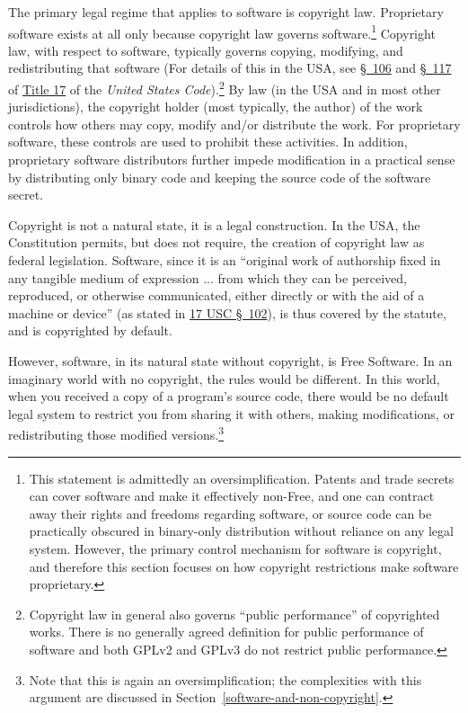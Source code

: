 \label{explaining-copyright}

The primary legal regime that applies to software is copyright law.
Proprietary software exists at all only because copyright law governs
software.\footnote{This statement is admittedly an oversimplification. Patents and
  trade secrets can cover software and make it effectively non-Free, and one
  can contract away their rights and freedoms regarding software, or source
  code can be practically obscured in binary-only distribution without
  reliance on any legal system.  However, the primary control mechanism for
  software is copyright, and therefore this section focuses on how copyright
  restrictions make software proprietary.} Copyright law, with respect to
software, typically governs copying, modifying, and redistributing that
software (For details of this in the USA, see
\href{http://www.copyright.gov/title17/92chap1.html#106}{\S~106} and
\href{http://www.copyright.gov/title17/92chap1.html#117}{\S~117} of
\href{http://www.law.cornell.edu/uscode/text/17}{Title 17} of the
\textit{United States Code}).\footnote{Copyright law in general also governs
  ``public performance'' of copyrighted works. There is no generally agreed
  definition for public performance of software and both GPLv2 and GPLv3 do
  not restrict public performance.} By law (in the USA and in most other
jurisdictions), the copyright holder (most typically, the author) of the work controls
how others may copy, modify and/or distribute the work. For proprietary
software, these controls are used to prohibit these activities. In addition,
proprietary software distributors further impede modification in a practical
sense by distributing only binary code and keeping the source code of the
software secret.

Copyright is not a natural state, it is a legal construction. In the USA, the
Constitution permits, but does not require, the creation of copyright law as
federal legislation.  Software, since it is an ``original work of authorship
fixed in any tangible medium of expression ...  from which they can be
perceived, reproduced, or otherwise communicated, either directly or with the
aid of a machine or device'' (as stated in
\href{http://www.law.cornell.edu/uscode/text/17/102}{17 USC \S~102}), is thus
covered by the statute, and is copyrighted by default.

However, software, in its natural state without copyright, is Free
Software. In an imaginary world with no copyright, the rules would be
different. In this world, when you received a copy of a program's source
code, there would be no default legal system to restrict you from sharing it
with others, making modifications, or redistributing those modified
versions.\footnote{Note that this is again an oversimplification; the
  complexities with this argument are discussed in
  Section~\ref{software-and-non-copyright}.}

